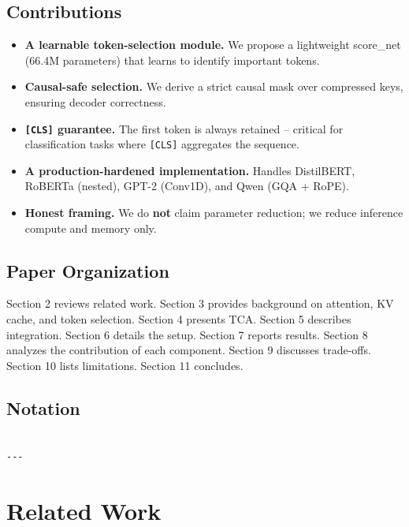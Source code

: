 \subsection{Contributions}

\begin{itemize}
\item \textbf{A learnable token-selection module.} We propose a lightweight
  score\_net (66.4M parameters) that learns to identify
  important tokens.
\item \textbf{Causal-safe selection.} We derive a strict causal mask over compressed
  keys, ensuring decoder correctness.
\item \textbf{\texttt{[CLS]} guarantee.} The first token is always retained -- critical for
  classification tasks where \texttt{[CLS]} aggregates the sequence.
\item \textbf{A production-hardened implementation.} Handles DistilBERT, RoBERTa
  (nested), GPT-2 (Conv1D), and Qwen (GQA + RoPE).
\item \textbf{Honest framing.} We do \textbf{not} claim parameter reduction; we reduce
  inference compute and memory only.

\end{itemize}
\subsection{Paper Organization}

Section 2 reviews related work. Section 3 provides background on attention, 
KV cache, and token selection. Section 4 presents TCA. Section 5 describes 
integration. Section 6 details the setup. Section 7 reports results. 
Section 8 analyzes the contribution of each component. Section 9 discusses 
trade-offs. Section 10 lists limitations. Section 11 concludes.



\subsection{Notation}

\begin{lstlisting}

---
\end{lstlisting}

\section{Related Work}

